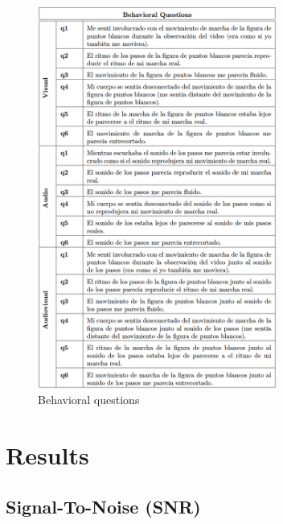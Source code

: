 \begin{figure}[ht]
    \centering
    \includegraphics[width=0.70\textwidth]{appendix/questions.png}
    \caption{Behavioral questions}
    \label{fig: Behavioral questions}
\end{figure}

\clearpage
\section*{Results}
\subsection*{Signal-To-Noise (SNR)}

